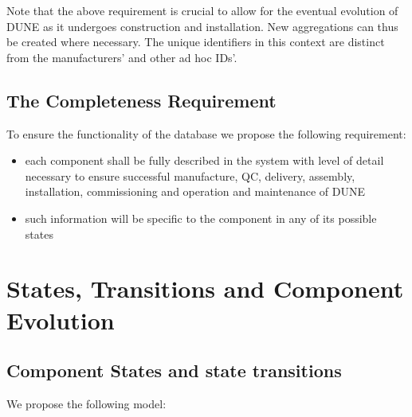 \documentclass[pdftex,12pt,letter]{article}
\begin{document}
\noindent Note that the above requirement is crucial to allow for the eventual evolution of DUNE as it undergoes construction and installation.
New aggregations can thus be created where necessary. The unique identifiers in this context are distinct from the manufacturers' and other ad hoc IDs'.





\subsection{The Completeness Requirement}

To ensure the functionality of the database we propose the following requirement:
\begin{itemize}
\item each component shall be fully described in the system with level of detail necessary to
ensure successful manufacture, QC, delivery, assembly, installation, commissioning
and operation and maintenance of DUNE

\item such information will be specific to the component in any of its possible states

\end{itemize}


\section{States, Transitions and Component Evolution}

\subsection{Component States and state transitions}

We propose the following model:
\end{document}

